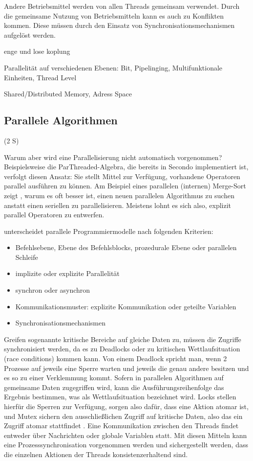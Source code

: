 \documentclass[a4paper,12pt,twoside]{article}
\begin{document}
Andere Betriebsmittel werden von allen Threads gemeinsam verwendet. Durch die gemeinsame Nutzung von Betriebsmitteln kann es auch zu Konflikten kommen. Diese müssen durch den Einsatz von Synchronisationsmechanismen aufgelöst werden. 

enge und lose koplung

Parallelität auf verschiedenen Ebenen: Bit, Pipelinging, Multifunktionale Einheiten, Thread Level

Shared/Distributed Memory, Adress Space


\subsection{Parallele Algorithmen} (2 S)

Warum aber wird eine Parallelisierung nicht automatisch vorgenommen? Beispielsweise die ParThreaded-Algebra, die bereits in Secondo implementiert ist, verfolgt diesen Ansatz: Sie stellt Mittel zur Verfügung, vorhandene Operatoren parallel ausführen zu können. Am Beispiel eines parallelen (internen) Merge-Sort zeigt {\textcite{McCool2012}}, warum es oft besser ist, einen neuen parallelen Algorithmus zu suchen anstatt einen seriellen zu parallelisieren. Meistens lohnt es sich also, explizit parallel Operatoren zu entwerfen.

{\textcite[S.104]{Rauber2013}} unterscheidet parallele Programmiermodelle nach folgenden Kriterien:

\begin{itemize}
	\item Befehlsebene, Ebene des Befehlsblocks, prozedurale Ebene oder parallelen Schleife
	\item implizite oder explizite Parallelität
	\item synchron oder asynchron
	\item Kommunikationsmuster: explizite Kommunikation oder geteilte Variablen
	\item Synchronisationsmechanismen
\end{itemize} 

Greifen sogenannte kritische Bereiche auf gleiche Daten zu, müssen die Zugriffe synchronisiert werden, da es zu Deadlocks oder zu kritischen Wettlaufsituation (race conditions) kommen kann.  Von einem Deadlock spricht man, wenn 2 Prozesse auf jeweils eine Sperre warten und jeweils die genau andere besitzen und es so zu einer Verklemmung kommt. Sofern in parallelen Algorithmen auf gemeinsame Daten zugegriffen wird, kann die Ausführungsreihenfolge das Ergebnis bestimmen, was als Wettlaufsituation bezeichnet wird. Locks stellen hierfür die Sperren zur Verfügung, sorgen also dafür, dass eine Aktion atomar ist, und Mutex sichern den ausschließlichen Zugriff auf kritische Daten, also das ein Zugriff atomar stattfindet {\autocite{Rauber2013}}. Eine Kommunikation zwischen den Threads findet entweder über Nachrichten oder globale Variablen statt. Mit diesen Mitteln kann eine Prozesssynchronisation vorgenommen werden und sichergestellt werden, dass die einzelnen Aktionen der Threads konsistenzerhaltend sind.
\end{document}
